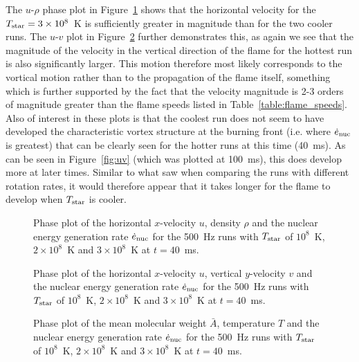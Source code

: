 \documentclass[preprint,times,tighten]{aastex63}
\begin{document}
The $u$-$\rho$ phase plot in Figure~\ref{fig:urho_hot} shows that the horizontal velocity for the $T_{\rm star} = 3\times10^8$~K is sufficiently greater in magnitude than for the two cooler runs. The $u$-$v$ plot in Figure~\ref{fig:uv_hot} further demonstrates this, as again we see that the magnitude of the velocity in the vertical direction of the flame for the hottest run is also significantly larger. This motion therefore most likely corresponds to the vortical motion rather than to the propagation of the flame itself, something which is further supported by the fact that the velocity magnitude is 2-3 orders of magnitude greater than the flame speeds listed in Table~\ref{table:flame_speeds}. Also of interest in these plots is that the coolest run does not seem to have developed the characteristic vortex structure at the burning front (i.e. where $\dot{e}_{\rm nuc}$ is greatest) that can be clearly seen for the hotter runs at this time (40~ms). As can be seen in Figure~\ref{fig:uv} (which was plotted at 100~ms), this does develop more at later times. Similar to what saw when comparing the runs with different rotation rates, it would therefore appear that it takes longer for the flame to develop when $T_{\rm star}$ is cooler. 

\begin{figure}[t]
    \centering
    \caption{\label{fig:urho_hot}Phase plot of the horizontal $x$-velocity $u$, density $\rho$ and the nuclear energy generation rate $\dot{e}_{\rm nuc}$ for the 500~Hz runs with $T_{\rm star}$ of $10^8$~K, $2\times10^8$~K and $3\times10^8$~K at $t = 40$~ms.}
\end{figure}

\begin{figure}[t]
    \centering
    \caption{\label{fig:uv_hot}Phase plot of the horizontal $x$-velocity $u$, vertical $y$-velocity $v$ and the nuclear energy generation rate $\dot{e}_{\rm nuc}$ for the 500~Hz runs with $T_{\rm star}$ of $10^8$~K, $2\times10^8$~K and $3\times10^8$~K at $t = 40$~ms.}
\end{figure}

\begin{figure}[t]
    \centering
    \caption{\label{fig:abar_hot}Phase plot of the mean molecular weight $\bar{A}$, temperature $T$ and the nuclear energy generation rate $\dot{e}_{\rm nuc}$ for the 500~Hz runs with $T_{\rm star}$ of $10^8$~K, $2\times10^8$~K and $3\times10^8$~K at $t = 40$~ms.}
\end{figure}
\end{document}
